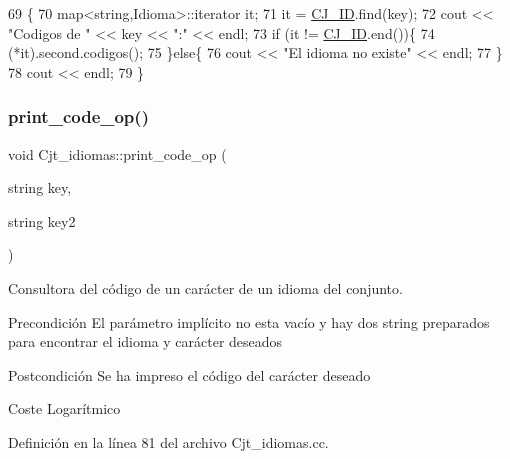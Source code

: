 \begin{DoxyCode}
69                                        \{
70   map<string,Idioma>::iterator it;
71   it = \hyperlink{class_cjt__idiomas_aeb67a7100b1345a160fb85466bd4e5f6}{CJ\_ID}.find(key);
72   cout << \textcolor{stringliteral}{"Codigos de "} << key << \textcolor{stringliteral}{":"} << endl;
73   \textcolor{keywordflow}{if} (it != \hyperlink{class_cjt__idiomas_aeb67a7100b1345a160fb85466bd4e5f6}{CJ\_ID}.end())\{
74     (*it).second.codigos();
75   \}\textcolor{keywordflow}{else}\{
76      cout << \textcolor{stringliteral}{"El idioma no existe"} << endl;
77    \}
78    cout << endl;
79 \}
\end{DoxyCode}
\mbox{\label{class_cjt__idiomas_afb0c806ea9fb7422f10d7767ef101743}} 
\subsubsection{\texorpdfstring{print\+\_\+code\+\_\+op()}{print\_code\_op()}}
{\footnotesize\ttfamily void Cjt\+\_\+idiomas\+::print\+\_\+code\+\_\+op (\begin{DoxyParamCaption}\item[{string}]{key,  }\item[{string}]{key2 }\end{DoxyParamCaption})}



Consultora del código de un carácter de un idioma del conjunto. 

\begin{DoxyPrecond}{Precondición}
El parámetro implícito no esta vacío y hay dos string preparados para encontrar el idioma y carácter deseados 
\end{DoxyPrecond}
\begin{DoxyPostcond}{Postcondición}
Se ha impreso el código del carácter deseado 
\end{DoxyPostcond}
\begin{DoxyParagraph}{Coste}
Logarítmico 
\end{DoxyParagraph}


Definición en la línea 81 del archivo Cjt\+\_\+idiomas.\+cc.


